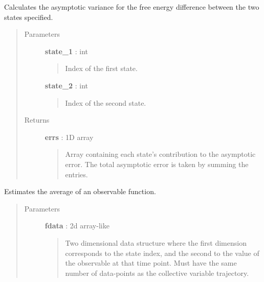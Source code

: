 \documentclass[letterpaper,10pt,english]{sphinxmanual}
\begin{document}
\begin{fulllineitems}

\begin{fulllineitems}
\label{modules/emus:emus.emus.avar_zfe}
Calculates the asymptotic variance for the free energy difference between the two states specified.
\begin{quote}\begin{description}
\item[{Parameters}] \leavevmode
\textbf{state\_1} : int
\begin{quote}

Index of the first state.
\end{quote}

\textbf{state\_2} : int
\begin{quote}

Index of the second state.
\end{quote}

\item[{Returns}] \leavevmode
\textbf{errs} : 1D array
\begin{quote}

Array containing each state's contribution to the asymptotic error.  The total asymptotic error is taken by summing the entries.
\end{quote}

\end{description}\end{quote}

\end{fulllineitems}


\begin{fulllineitems}
\label{modules/emus:emus.emus.calc_obs}
Estimates the average of an observable function.
\begin{quote}\begin{description}
\item[{Parameters}] \leavevmode
\textbf{fdata} : 2d array-like
\begin{quote}

Two dimensional data structure where the first dimension corresponds to the state index, and the second to the value of the observable at that time point.  Must have the same number of data-points as the collective variable trajectory.
\end{quote}


\end{description}
\end{quote}
\end{fulllineitems}
\end{fulllineitems}
\end{document}
